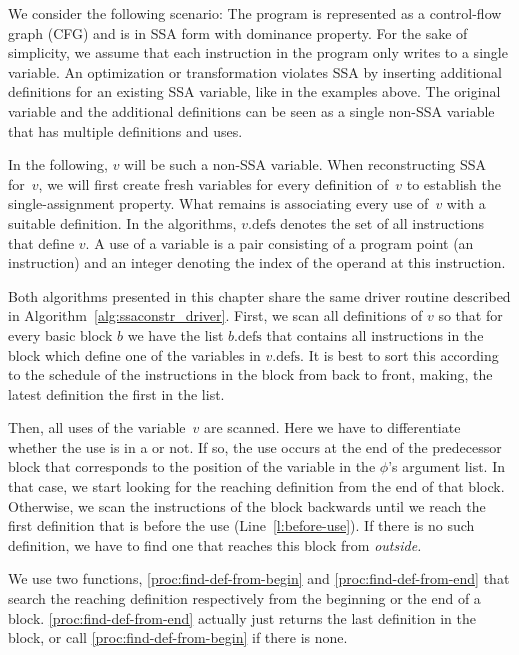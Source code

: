 {We consider the following scenario: The program is represented as a control-flow graph (CFG) and is in SSA form with dominance property.
For the sake of simplicity, we assume that each instruction in the program only writes to a single variable.
An optimization or transformation violates SSA by inserting additional definitions for an existing SSA variable, like in the examples above.
The original variable and the additional definitions can be seen as a single non-SSA variable that has multiple definitions and uses.

In the following, $v$ will be such a non-SSA variable.
When reconstructing SSA for~$v$, we will first create fresh variables for every definition of~$v$ to establish the single-assignment property. 
What remains is associating every use of~$v$ with a suitable definition.
In the algorithms, $v.\textrm{defs}$ denotes the set of all instructions that define $v$.
A use of a variable is a pair consisting of a program point (an instruction) and an integer denoting the index of the operand at this instruction.

Both algorithms presented in this chapter share the same driver routine 
described in Algorithm~\ref{alg:ssaconstr_driver}.
First, we scan all definitions of $v$ so that
for every basic block $b$ we have the list $b.\textrm{defs}$ that contains all instructions in the block which define one of the variables in $v.\textrm{defs}$.
It is best to sort this according to the schedule of the instructions in the block from back to front, making, the latest definition the first in the list.

Then, all uses of the variable~$v$ are scanned.
Here we have to differentiate whether the use is in a \phifun or not.
If so, the use occurs at the end of the predecessor block that corresponds to the position of the variable in the $\phi$'s argument list.
In that case, we start looking for the reaching definition from the end of that block.
Otherwise, we scan the instructions of  the block backwards until we reach the first definition that is before the use (Line~\ref{l:before-use}).
If there is no such definition, we have to find one that reaches this block from \emph{outside.}

We use two functions, \ref{proc:find-def-from-begin} and \ref{proc:find-def-from-end} that search the reaching definition respectively from the beginning or the end of a block.
\ref{proc:find-def-from-end} actually just returns the last definition in the block, or call \ref{proc:find-def-from-begin} if there is none.

}
